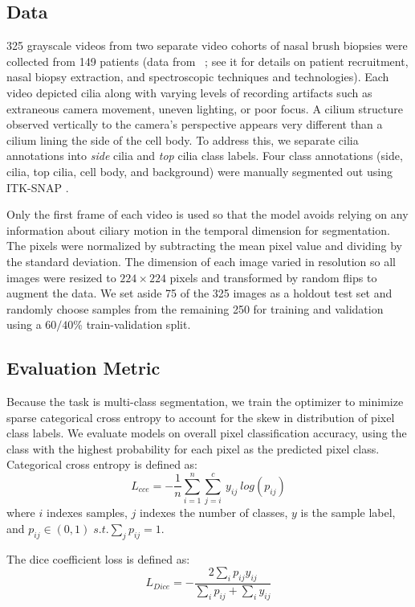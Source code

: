 \documentclass{llncs}
\begin{document}
\subsection{Data}
325 grayscale videos from two separate video cohorts of nasal brush biopsies were collected from 149 patients (data from ~\cite{QuinnSTM}; see it for details on patient recruitment, nasal biopsy extraction, and spectroscopic techniques and technologies). Each video depicted cilia along with varying levels of recording artifacts such as extraneous camera movement, uneven lighting, or poor focus. A cilium structure observed vertically to the camera's perspective appears very different than a cilium lining the side of the cell body. To address this, we separate cilia annotations into \textit{side} cilia and \textit{top} cilia class labels. Four class annotations (side, cilia, top cilia, cell body, and background) were manually segmented out using ITK-SNAP \cite{ITK-SNAP}.
\par
Only the first frame of each video is used so that the model avoids relying on any information about ciliary motion in the temporal dimension for segmentation. The pixels were normalized by subtracting the mean pixel value and dividing by the standard deviation. The dimension of each image varied in resolution so all images were resized to $224 \times 224$ pixels and transformed by random flips to augment the data. We set aside 75 of the 325 images as a holdout test set and randomly choose samples from the remaining 250 for training and validation using a $60/40$\% train-validation split.

\subsection{Evaluation Metric}
Because the task is multi-class segmentation, we train the optimizer to minimize sparse categorical cross entropy to account for the skew in distribution of pixel class labels. We evaluate models on overall pixel classification accuracy, using the class with the highest probability for each pixel as the predicted pixel class. Categorical cross entropy is defined as:
\begin{equation}
L_{cce} = -\frac{1}{n}\sum^n_{i=1}\sum^c_{j=i}\ y_{ij}\ log\left(p_{ij}\right)
\end{equation}
where $i$ indexes samples, $j$ indexes the number of classes, $y$ is the sample label, and $p_{ij} \in (0, 1) \; s.t. \sum_j p_{ij} = 1$.

The dice coefficient loss is defined as:
\begin{equation}
L_{Dice} = -\frac{2 \sum_i p_{ij} y_{ij}}{\sum_i p_{ij} + \sum_i y_{ij}}
\end{equation}
\end{document}

